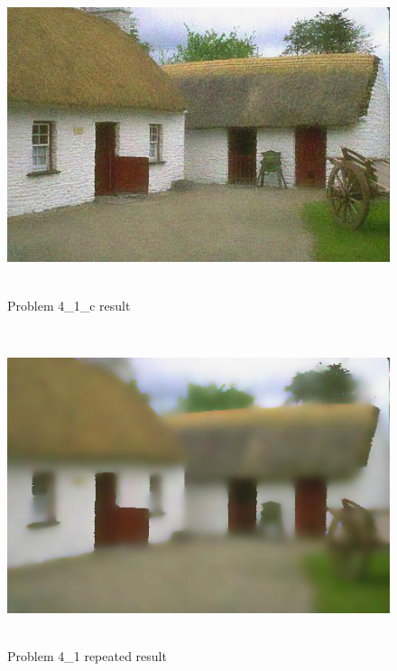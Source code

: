 \documentclass{article}
\begin{document}
\begin{figure}[!h]
  \centering
    \includegraphics[height=25em]{code/outputs/prob4_1_c.jpg}
  \caption{Problem 4\_1\_c result}
  \label{fig:output41c}
\end{figure}

\begin{figure}[!h]
  \centering
    \includegraphics[height=25em]{code/outputs/prob4_1_rep.jpg}
  \caption{Problem 4\_1 repeated result}
  \label{fig:output41rep}
\end{figure}
\end{document}
